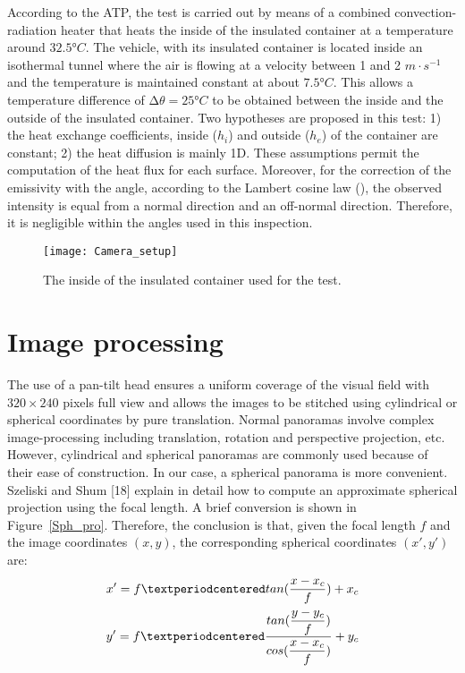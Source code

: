 \documentclass{tQRT2e}
\begin{document}
According to the ATP, the test is carried out by means of a combined convection-radiation heater that heats the inside of the insulated container at a temperature around $ 32.5°C $. The vehicle, with its insulated container is located inside an isothermal tunnel where the air is flowing at a velocity between 1 and 2 $ m⋅s^{−1} $ and the temperature is maintained constant at about $ 7.5 °C $. This allows a temperature difference of $ ∆\theta  = 25°C$ to be obtained between the inside and the outside of the insulated container. Two hypotheses are proposed in this test: 1) the heat exchange coefficients, inside ($ h_i $) and outside ($ h_e $) of the container are constant; 2) the heat diffusion is mainly 1D. These assumptions permit the computation of the heat flux for each surface. Moreover, for the correction of the emissivity with the angle, according to the Lambert cosine law (\cite{dragano2009experimental,Hottel1967a}), the observed intensity is equal from a normal direction and an off-normal direction. Therefore, it is negligible within the angles used  in this inspection.
\begin{figure}[ht]
	\centering
	\texttt{[image: Camera\_setup]}
	\caption{The inside of the insulated container used for the test.}
	\label{Exp_setup}
\end{figure}


\section{Image processing}
The use of a pan-tilt head ensures a uniform coverage of the visual field with $ 320×240 $ pixels full view and allows the images to be stitched using cylindrical or spherical coordinates by pure translation. Normal panoramas involve complex image-processing including translation, rotation and perspective projection, etc. However, cylindrical and spherical panoramas are commonly used because of their ease of construction. In our case, a spherical panorama is more convenient. Szeliski and Shum [18] explain in detail how to compute an approximate spherical projection using the focal length. A brief conversion is shown in Figure~\ref{Sph_pro}. Therefore, the conclusion is that, given the focal length $ f $ and the image coordinates $ (x, y) $, the corresponding spherical coordinates $ (x′, y′) $ are:
\begin{align}
x'={} f·tan(\dfrac{x-x_c}{f})+x_c \notag \\
y'=f·\frac{tan(\dfrac{y-y_c}{f})}{cos(\dfrac{x-x_c}{f})} +y_c
\end{align}
\end{document}

